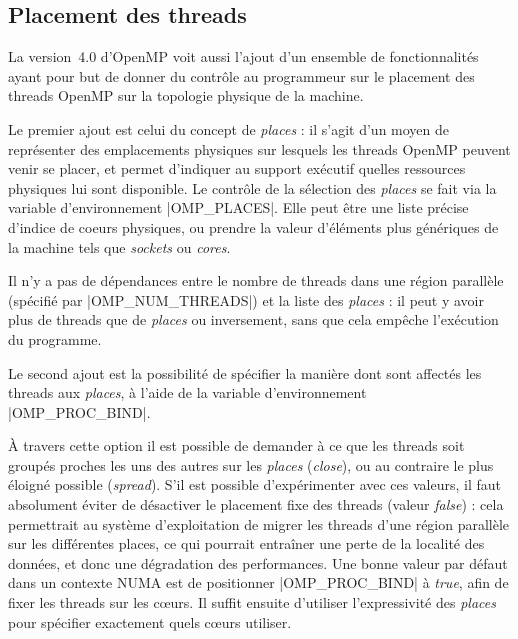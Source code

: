 \subsection{Placement des threads}

La version~4.0 d'OpenMP voit aussi l'ajout d'un ensemble de fonctionnalités ayant pour but de donner du contrôle au programmeur sur le placement des threads OpenMP sur la topologie physique de la machine.

Le premier ajout est celui du concept de \emph{places} : il s'agit d'un moyen de représenter des emplacements physiques sur lesquels les threads OpenMP peuvent venir se placer, et permet d'indiquer au support exécutif quelles ressources physiques lui sont disponible.
Le contrôle de la sélection des \emph{places} se fait via la variable d'environnement |OMP_PLACES|.
Elle peut être une liste précise d'indice de coeurs physiques, ou prendre la valeur d'éléments plus génériques de la machine tels que \emph{sockets} ou \emph{cores}.

Il n'y a pas de dépendances entre le nombre de threads dans une région parallèle (spécifié par |OMP_NUM_THREADS|) et la liste des \emph{places} : il peut y avoir plus de threads que de \emph{places} ou inversement, sans que cela empêche l'exécution du programme.

Le second ajout est la possibilité de spécifier la manière dont sont affectés les threads aux \emph{places}, à l'aide de la variable d'environnement |OMP_PROC_BIND|.

À travers cette option il est possible de demander à ce que les threads soit groupés proches les uns des autres sur les \emph{places} (\emph{close}), ou au contraire le plus éloigné possible (\emph{spread}).
S'il est possible d'expérimenter avec ces valeurs, il faut absolument éviter de désactiver le placement fixe des threads (valeur \emph{false}) : cela permettrait au système d'exploitation de migrer les threads d'une région parallèle sur les différentes places, ce qui pourrait entraîner une perte de la localité des données, et donc une dégradation des performances.
Une bonne valeur par défaut dans un contexte NUMA est de positionner |OMP_PROC_BIND| à \emph{true}, afin de fixer les threads sur les cœurs.
Il suffit ensuite d'utiliser l'expressivité des \emph{places} pour spécifier exactement quels cœurs utiliser.

